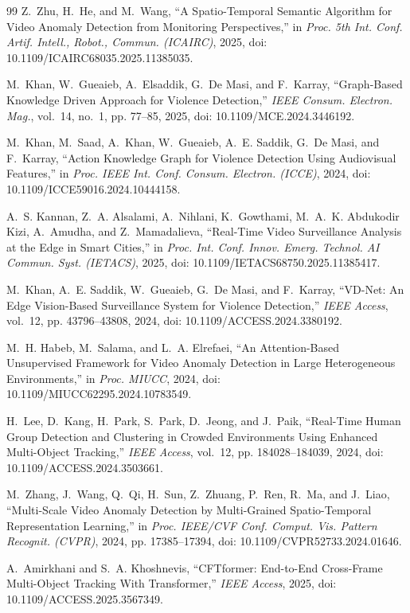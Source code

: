 \documentclass[12pt,a4paper]{report}
\begin{document}
\begin{thebibliography}{99}
Z.~Zhu, H.~He, and M.~Wang, ``A Spatio-Temporal Semantic Algorithm for Video Anomaly Detection from Monitoring Perspectives,'' in \emph{Proc. 5th Int. Conf. Artif. Intell., Robot., Commun. (ICAIRC)}, 2025, doi: 10.1109/ICAIRC68035.2025.11385035.

M.~Khan, W.~Gueaieb, A.~Elsaddik, G.~De Masi, and F.~Karray, ``Graph-Based Knowledge Driven Approach for Violence Detection,'' \emph{IEEE Consum. Electron. Mag.}, vol.~14, no.~1, pp. 77--85, 2025, doi: 10.1109/MCE.2024.3446192.

M.~Khan, M.~Saad, A.~Khan, W.~Gueaieb, A.~E. Saddik, G.~De Masi, and F.~Karray, ``Action Knowledge Graph for Violence Detection Using Audiovisual Features,'' in \emph{Proc. IEEE Int. Conf. Consum. Electron. (ICCE)}, 2024, doi: 10.1109/ICCE59016.2024.10444158.

A.~S. Kannan, Z.~A. Alsalami, A.~Nihlani, K.~Gowthami, M.~A.~K. Abdukodir Kizi, A.~Amudha, and Z.~Mamadalieva, ``Real-Time Video Surveillance Analysis at the Edge in Smart Cities,'' in \emph{Proc. Int. Conf. Innov. Emerg. Technol. AI Commun. Syst. (IETACS)}, 2025, doi: 10.1109/IETACS68750.2025.11385417.

M.~Khan, A.~E. Saddik, W.~Gueaieb, G.~De Masi, and F.~Karray, ``VD-Net: An Edge Vision-Based Surveillance System for Violence Detection,'' \emph{IEEE Access}, vol.~12, pp. 43796--43808, 2024, doi: 10.1109/ACCESS.2024.3380192.

M.~H. Habeb, M.~Salama, and L.~A. Elrefaei, ``An Attention-Based Unsupervised Framework for Video Anomaly Detection in Large Heterogeneous Environments,'' in \emph{Proc. MIUCC}, 2024, doi: 10.1109/MIUCC62295.2024.10783549.

H.~Lee, D.~Kang, H.~Park, S.~Park, D.~Jeong, and J.~Paik, ``Real-Time Human Group Detection and Clustering in Crowded Environments Using Enhanced Multi-Object Tracking,'' \emph{IEEE Access}, vol.~12, pp. 184028--184039, 2024, doi: 10.1109/ACCESS.2024.3503661.

M.~Zhang, J.~Wang, Q.~Qi, H.~Sun, Z.~Zhuang, P.~Ren, R.~Ma, and J.~Liao, ``Multi-Scale Video Anomaly Detection by Multi-Grained Spatio-Temporal Representation Learning,'' in \emph{Proc. IEEE/CVF Conf. Comput. Vis. Pattern Recognit. (CVPR)}, 2024, pp. 17385--17394, doi: 10.1109/CVPR52733.2024.01646.

A.~Amirkhani and S.~A. Khoshnevis, ``CFTformer: End-to-End Cross-Frame Multi-Object Tracking With Transformer,'' \emph{IEEE Access}, 2025, doi: 10.1109/ACCESS.2025.3567349.


\end{thebibliography}
\end{document}
